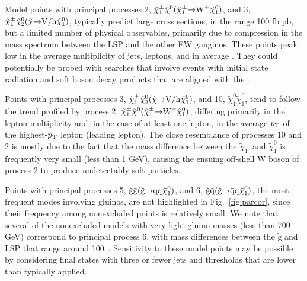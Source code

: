 Model points with principal processes 2, $\tilde{\chi}^{\pm}_{1}\tilde{\chi}^{0}(\tilde{\chi}^{\pm}_{1} \hspace{-1mm}\rightarrow \hspace{-1mm}{\rm W}^{\pm}\tilde{\chi}_{1}^{0})$, and 3, $\tilde{\chi}^{\pm}_{1}\tilde{\chi}^{0}_{2}(\tilde{\chi} \hspace{-1mm}\rightarrow \hspace{-1mm}{\rm V/h}\tilde{\chi}_{1}^{0})$, typically predict large cross sections, in the range 100 fb pb, 
but a limited number of physical observables, primarily due to compression in the mass spectrum between the LSP and the other EW gauginos. These points peak low in the average multiplicity of jets, leptons, and in average \MET{}. They could potentially be probed with searches that involve events with initial state radiation and soft boson decay products that are aligned with the \MET{}.

Points with principal processes 3, $\tilde{\chi}^{\pm}_{1}\tilde{\chi}^{0}_{2}(\tilde{\chi} \hspace{-1mm}\rightarrow \hspace{-1mm}{\rm V/h}\tilde{\chi}_{1}^{0})$, and 10, $\tilde{\chi}^{0}_{1}\tilde{\chi}^{0}_{1}$, tend to follow the trend profiled
by process 2, $\tilde{\chi}^{\pm}_{1}\tilde{\chi}^{0}(\tilde{\chi}^{\pm}_{1} \hspace{-1mm}\rightarrow \hspace{-1mm}{\rm W}^{\pm}\tilde{\chi}_{1}^{0})$, differing primarily in the lepton multiplicity and, in the case of at least one lepton, in the average $p_{\text{T}}$ of the highest-$p_{\text{T}}$ lepton (leading lepton). The close resemblance of
processes 10 and 2  is mostly due to the fact that the mass
difference between the $\tilde{\chi}_{1}^\pm$ and
$\tilde{\chi}_1^0$ is frequently very small (less than 1 GeV), causing the ensuing off-shell W 
boson of process 2 to produce undetectably soft particles.

Points with principal processes 5, $\tilde{\rm g}\tilde{\rm g}(\tilde{\rm g} \hspace{-1mm}\rightarrow \hspace{-1mm}{\rm qq}\tilde{\chi}_{1}^{0})$, and 6, $\tilde{\rm g}\tilde{\rm q}(\tilde{\rm g} \hspace{-1mm}\rightarrow \hspace{-1mm}\tilde{\rm q}{\rm q}\tilde{\chi}_{1}^{0})$, the most frequent modes
involving gluinos, are not highlighted in Fig.~\ref{fig:parcor}, since their frequency among nonexcluded points is relatively small. We note that several of the nonexcluded models with very light gluino masses (less than 700 GeV) correspond to principal process 6, with mass differences between the $\tilde{\text{g}}$ and LSP that range around 100~\GeV. Sensitivity to these model points may be possible by considering final states with three or fewer jets and \MET{} thresholds that are lower than typically applied.

